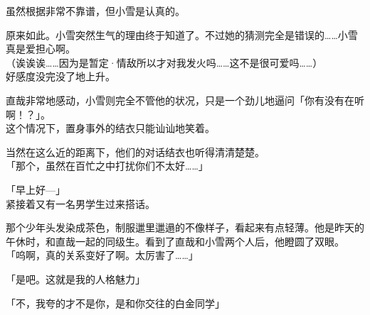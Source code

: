 虽然根据非常不靠谱，但小雪是认真的。

原来如此。小雪突然生气的理由终于知道了。不过她的猜测完全是错误的……小雪真是爱担心啊。\\

（诶诶诶……因为是暂定·情敌所以才对我发火吗……这不是很可爱吗……）\\

好感度没完没了地上升。

直哉非常地感动，小雪则完全不管他的状况，只是一个劲儿地逼问「你有没有在听啊！？」。\\

这个情况下，置身事外的结衣只能讪讪地笑着。

当然在这么近的距离下，他们的对话结衣也听得清清楚楚。\\

「那个，虽然在百忙之中打扰你们不太好……」

「早上好—」\\

紧接着又有一名男学生过来搭话。

那个少年头发染成茶色，制服邋里邋遢的不像样子，看起来有点轻薄。他是昨天的午休时，和直哉一起的同级生。看到了直哉和小雪两个人后，他瞪圆了双眼。\\

「呜啊，真的关系变好了啊。太厉害了……」

「是吧。这就是我的人格魅力」

「不，我夸的才不是你，是和你交往的白金同学」

